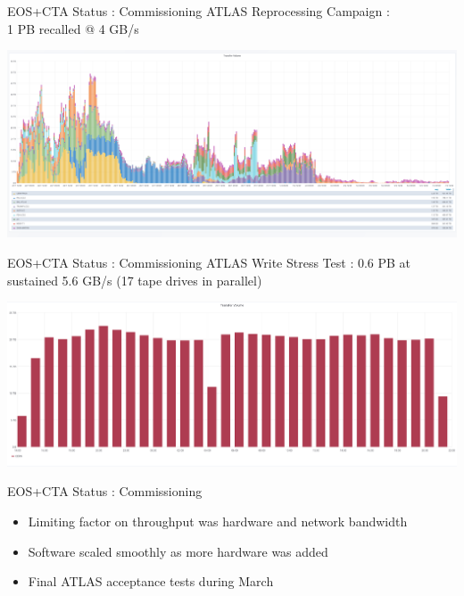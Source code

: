 \documentclass[aspectratio=1610]{beamer}
\begin{document}
\begin{frame}{EOS+CTA Status : Commissioning}{}
   \centering
   \vspace{1ex}
   {\LARGE\color{cern@blue}ATLAS Reprocessing Campaign :\\
   1 PB recalled @ 4 GB/s}

\begin{adjustwidth}{-1cm}{-1cm}
   \includegraphics[width=\linewidth]{images/RecallTest}
\end{adjustwidth}
\end{frame}

\begin{frame}{EOS+CTA Status : Commissioning}{}
   \centering
   \vspace{1ex}
   {\LARGE\color{cern@blue}ATLAS Write Stress Test : 0.6 PB at\\
   sustained 5.6 GB/s (17 tape drives in parallel)\\[1ex]}

   \includegraphics[width=\linewidth]{images/WriteStressTest}
\end{frame}

\begin{frame}{EOS+CTA Status : Commissioning}{}
   \begin{itemize}
      \item Limiting factor on throughput was hardware and network bandwidth
      \item Software scaled smoothly as more hardware was added
      \item Final ATLAS acceptance tests during March
   \end{itemize}
\end{frame}
\end{document}
